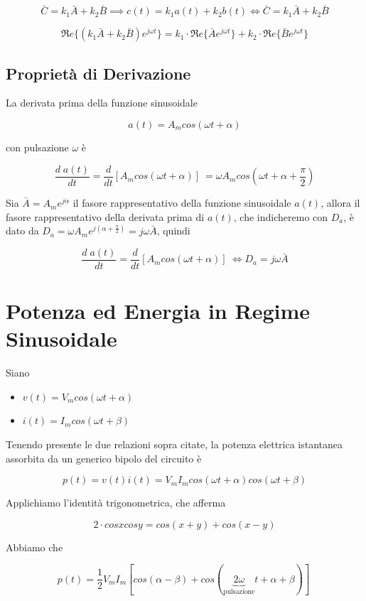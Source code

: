 \documentclass[a4paper]{report}
\begin{document}
\[
\bar{C} = k_1\bar{A}+k_2\bar{B} \implies c(t)=k_1a(t)+k_2b(t)
\Longleftrightarrow \bar{C}=k_1\bar{A}+k_2\bar{B}
\]

\[
\Re e\{(k_1\bar{A}+k_2\bar{B})e^{j\omega t}\} = k_1\cdot \Re e\{\bar{A}e^{j\omega
  t}\}+k_2\cdot \Re e\{\bar{B}e^{j\omega t}\}
\]

\subsection{Propriet\`a di Derivazione}
La derivata prima della funzione sinusoidale

\[
a(t)=A_mcos(\omega t+\alpha)
\]

con pulsazione $\omega$ \`e

\[
\dfrac{d\;a(t)}{dt}=\dfrac{d}{dt}[A_mcos(\omega t+\alpha)]\ = \omega
A_m cos\left(\omega t+\alpha+ \dfrac{\pi}{2}\right)
\]

Sia $\bar{A} = A_me^{j\alpha}$ il fasore rappresentativo della
funzione sinusoidale $a(t)$, allora il fasore rappresentativo della
derivata prima di $a(t)$, che indicheremo con $D_a$, \`e dato da $D_a
= \omega A_m e^{j \left(\alpha+ \frac{\pi}{2}\right)} = j\omega
\bar{A}$, quindi

\[
\dfrac {d\;a(t)}{dt}=\dfrac{d}{dt}[A_mcos(\omega
  t+\alpha)]\ \Longleftrightarrow D_a=j\omega \bar{A}
\]

\section{Potenza ed Energia in Regime Sinusoidale}

Siano
\begin{itemize}
\item $v(t)=V_mcos(\omega t+\alpha)$
\item $i(t)=I_mcos(\omega t+\beta)$
\end{itemize}

Tenendo presente le due relazioni sopra citate, la potenza elettrica
istantanea assorbita da un generico bipolo del circuito \`e

\[
p(t)=v(t)i(t)=V_mI_mcos(\omega t+\alpha)cos(\omega t+\beta)
\]

Applichiamo l'identit\`a trigonometrica, che afferma

\[
2\cdot cosxcosy = cos(x+y)+cos(x-y)
\]

Abbiamo che

\[
p(t)=\dfrac{1}{2}V_mI_m[cos(\alpha-\beta)+cos(\underbrace{2\omega}_\text
  {pulsazione} t+\alpha+\beta)]\
\]
\end{document}

